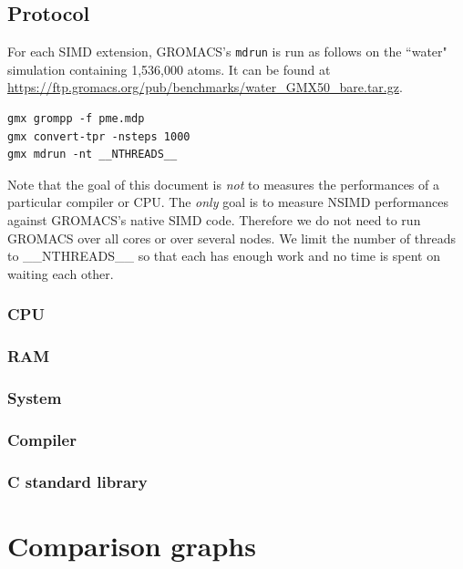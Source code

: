 \documentclass[a4paper,11pt]{article}
\newcommand{\gromacs}{GROMACS}
\begin{document}
\subsection{Protocol}

For each SIMD extension, \gromacs{}'s \texttt{mdrun} is run as follows on
the ``water" simulation containing 1,536,000 atoms. It can be found
at \url{https://ftp.gromacs.org/pub/benchmarks/water_GMX50_bare.tar.gz}.

\begin{lstlisting}
gmx grompp -f pme.mdp
gmx convert-tpr -nsteps 1000
gmx mdrun -nt __NTHREADS__
\end{lstlisting}

Note that the goal of this document is \emph{not} to measures the performances
of a particular compiler or CPU. The \emph{only} goal is to measure NSIMD
performances against \gromacs{}'s native SIMD code. Therefore we do not need
to run \gromacs{} over all cores or over several nodes. We limit the number
of threads to __NTHREADS__ so that each has enough work and no time is spent
on waiting each other.

\subsubsection{CPU}


\subsubsection{RAM}


\subsubsection{System}


\subsubsection{Compiler}


\subsubsection{C standard library}

 
\section{Comparison graphs}

\end{document}
